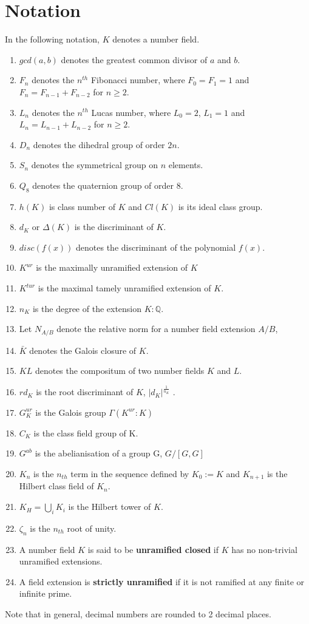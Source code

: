 \documentclass[12pt]{extarticle}
\newcommand{\Q}{\mathbb{Q}}
\newcommand{\<}{\langle}
\renewcommand{\>}{\rangle}
\theoremstyle{definition}
\begin{document}
\section{Notation}
In the following notation, $K$ denotes a number field.
\begin{enumerate}
    \item $gcd(a,b)$ denotes the greatest common divisor of $a$ and $b$.
    \item $F_n$ denotes the $n^{th}$ Fibonacci number, where 
    $F_0 = F_1 = 1$ and $F_{n} = F_{n-1} + F_{n-2}$ for $n \geq 2$.
    \item $L_n$ denotes the $n^{th}$ Lucas number, where 
    $L_0 = 2$, $L_1 = 1$ and $L_{n} = L_{n-1} + L_{n-2}$ for $n \geq 2$.
    \item $D_n$ denotes the dihedral group of order $2n$.
    \item $S_n$ denotes the symmetrical group on $n$ elements.
    \item $Q_8$ denotes the quaternion group of order $8$.
    \item $h(K)$ is class number of $K$ and $Cl(K)$ is its ideal class group.
    \item $d_K$ or $\Delta(K)$ is the discriminant of $K$.
    \item $disc(f(x))$ denotes the discriminant of the polynomial $f(x)$.
    \item $K^{ur}$ is the maximally unramified extension of $K$
    \item $K^{tur}$ is the maximal tamely unramified extension of $K$.
    \item $n_K$ is the degree of the extension $K:\Q$.
    \item Let $N_{A/B}$ denote the relative norm for a number field extension $A/B$,
    \item $\bar{K}$ denotes the Galois closure of $K$.
    \item $KL$ denotes the compositum of two number fields $K$ and $L$.
    \item $rd_K$ is the root discriminant of $K$, $|d_K|^\frac{1}{n_K}$ .
    \item $G_K^{ur}$ is the Galois group $\Gamma(K^{ur}:K)$
    \item $C_K$ is the class field group of K. 
    \item $G^{ab}$ is the abelianisation of a group G, $G/[G,G]$
    \item $K_n$ is the $n_{th}$ term in the sequence defined by $K_0:=K$ and $K_{n+1}$ is the Hilbert class field of $K_n$.
    \item $K_H=\bigcup_{i}K_{i}$ is the Hilbert tower of $K$.  
    \item $\zeta_n$ is the $n_{th}$ root of unity. 
    \item A number field $K$ is said to be \textbf{unramified closed} if $K$ has no non-trivial unramified extensions. 
    \item A field extension is \textbf{strictly unramified} if it is not ramified at any finite or infinite prime.

\end{enumerate}
 Note that in general, decimal numbers are rounded to 2 decimal places. 
\end{document}
